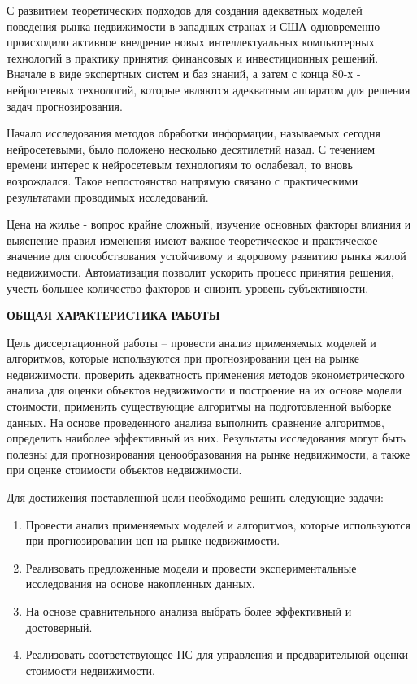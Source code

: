 С развитием теоретических подходов для создания адекватных моделей поведения рынка недвижимости в западных странах и
США одновременно происходило активное внедрение новых интеллектуальных компьютерных технологий в практику принятия
финансовых и инвестиционных решений. Вначале в виде экспертных систем и баз знаний, а затем с конца 80-х - нейросетевых
технологий, которые являются адекватным аппаратом для решения задач прогнозирования.

Начало исследования методов обработки информации, называемых сегодня нейросетевыми, было положено несколько десятилетий
назад. С течением времени интерес к нейросетевым технологиям то ослабевал, то вновь возрождался. Такое непостоянство
напрямую связано с практическими результатами проводимых исследований.

Цена на жилье - вопрос крайне сложный, изучение основных факторы влияния и выяснение правил изменения имеют важное теоретическое и
практическое значение для способствования устойчивому и здоровому развитию рынка жилой недвижимости.
Автоматизация позволит ускорить процесс принятия решения, учесть
большее количество факторов и снизить уровень субъективности.

\begin{center}
  \textbf{ОБЩАЯ ХАРАКТЕРИСТИКА РАБОТЫ}\\
\end{center}

Цель диссертационной работы – провести анализ применяемых моделей и алгоритмов, которые используются при
прогнозировании цен на рынке недвижимости, проверить адекватность применения методов эконометрического
анализа для оценки объектов недвижимости и построение на их основе модели стоимости, применить существующие алгоритмы на
подготовленной выборке данных.
На основе проведенного анализа выполнить сравнение алгоритмов, определить наиболее эффективный из них.
Результаты исследования могут быть полезны для прогнозирования
ценообразования на рынке недвижимости, а также при оценке стоимости объектов недвижимости.

Для достижения поставленной цели необходимо решить следующие задачи:
\begin{enumerate}
  \item Провести анализ применяемых моделей и алгоритмов, которые используются при прогнозировании цен на рынке недвижимости.
  \item Реализовать предложенные модели и провести экспериментальные исследования на основе накопленных данных.
  \item На основе сравнительного анализа выбрать более эффективный и достоверный.
  \item Реализовать соответствующее ПС для управления и предварительной оценки стоимости недвижимости.
\end{enumerate}

